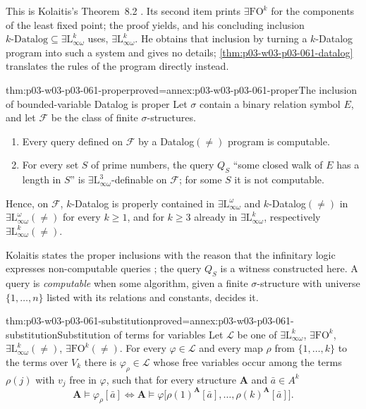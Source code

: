 This is Kolaitis's Theorem~8.2 \cite[Thm~8.2, p.~70]{Kolaitis2003ExpressivePowerNotes}.
Its second item prints \(\exists\mathrm{FO}^k\) for the components of the
least fixed point; the proof yields, and his concluding inclusion
\(k\text{-Datalog}\subseteq\exists\mathrm L^k_{\infty\omega}\) uses,
\(\exists\mathrm L^k_{\infty\omega}\). He obtains that inclusion by turning a
\(k\)-Datalog program into such a system and gives no details;
\cref{thm:p03-w03-p03-061-datalog} translates the rules of the program
directly instead.

\begin{hbtheorem}{thm:p03-w03-p03-061-proper}{proved=annex:p03-w03-p03-061-proper}{The inclusion of bounded-variable Datalog is proper}
Let \(\sigma\) contain a binary relation symbol \(E\), and let
\(\mathcal F\) be the class of finite \(\sigma\)-structures.
\begin{enumerate}
\item Every query defined on \(\mathcal F\) by a Datalog\((\neq)\) program is
      computable.
\item For every set \(S\) of prime numbers, the query \(Q_S\) ``some closed
      walk of \(E\) has a length in \(S\)'' is
      \(\exists\mathrm L^3_{\infty\omega}\)-definable on \(\mathcal F\); for
      some \(S\) it is not computable.
\end{enumerate}
Hence, on \(\mathcal F\), \(k\)-Datalog is properly contained in
\(\exists\mathrm L^\omega_{\infty\omega}\) and \(k\)-Datalog\((\neq)\) in
\(\exists\mathrm L^\omega_{\infty\omega}(\neq)\) for every \(k\ge1\), and for
\(k\ge3\) already in \(\exists\mathrm L^k_{\infty\omega}\), respectively
\(\exists\mathrm L^k_{\infty\omega}(\neq)\).
\end{hbtheorem}

Kolaitis states the proper inclusions with the reason that the infinitary
logic expresses non-computable queries
\cite[p.~71]{Kolaitis2003ExpressivePowerNotes}; the query \(Q_S\) is a
witness constructed here. A query is \emph{computable} when some algorithm,
given a finite \(\sigma\)-structure with universe \(\{1,\ldots,n\}\) listed
with its relations and constants, decides it.

\begin{hbtheorem}{thm:p03-w03-p03-061-substitution}{proved=annex:p03-w03-p03-061-substitution}{Substitution of terms for variables}
Let \(\mathcal L\) be one of \(\exists\mathrm L^k_{\infty\omega}\),
\(\exists\mathrm{FO}^k\), \(\exists\mathrm L^k_{\infty\omega}(\neq)\),
\(\exists\mathrm{FO}^k(\neq)\). For every \(\varphi\in\mathcal L\) and every
map \(\rho\) from \(\{1,\ldots,k\}\) to the terms over \(V_k\) there is
\(\varphi_\rho\in\mathcal L\) whose free variables occur among the terms
\(\rho(j)\) with \(v_j\) free in \(\varphi\), such that for every structure
\(\mathbf A\) and \(\bar a\in A^k\)
\[
 \mathbf A\models\varphi_\rho[\bar a]\iff
 \mathbf A\models\varphi\bigl[\rho(1)^{\mathbf A}[\bar a],\ldots,
 \rho(k)^{\mathbf A}[\bar a]\bigr].
\]
\end{hbtheorem}

